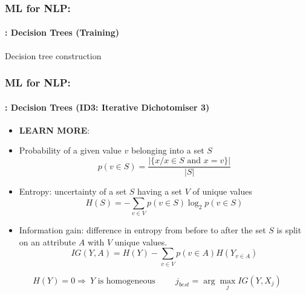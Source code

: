 \documentclass[xcolor=table]{beamer}
\begin{document}
	\begin{frame}
		\frametitle{ML for NLP: \insertsection}
		\framesubtitle{\insertsubsection: Decision Trees (Training)}
	
		\begin{block}{Decision tree construction}
			\scriptsize
			\begin{algorithm}[H]
				
				\Return {}\;
				
				
			\end{algorithm}
		\end{block}
		
	\end{frame}

	\begin{frame}
		\frametitle{ML for NLP: \insertsection}
		\framesubtitle{\insertsubsection: Decision Trees (ID3: Iterative Dichotomiser 3)}
		
		\begin{itemize}
			\item \textbf{LEARN MORE}: \cite{1986-quinlan}
			\item Probability of a given value $ v $ belonging into a set $ S $
			\[p(v\in S) = \frac{|\{x / x\in S \text{ and } x = v\}|}{|S|}\]
			\item Entropy: uncertainty of a set $ S $ having a set $ V $ of unique values
			\[H(S) = - \sum\limits_{v \in V} p(v\in S) \log_2 p(v\in S)\]
			\item Information gain: difference in entropy from before to after the set $ S $ is split on an attribute $ A $ with $ V $ unique values.
			\[IG(Y, A) = H(Y) - \sum_{v \in V} p(v\in A) H(Y_{v\in A})\] 
		\end{itemize}
	
		\[H(Y) = 0 \Rightarrow\ Y \text{ is homogeneous} \hspace{1cm} j_{best} = \arg\max_j IG(Y, X_j)\]
		
	\end{frame}
\end{document}
